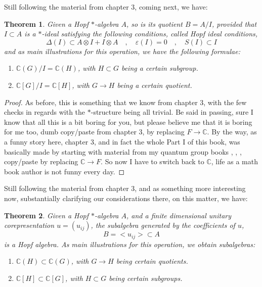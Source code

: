 \documentclass[12pt]{amsbook}
\newtheorem{theorem}{Theorem}[chapter]
\begin{document}
Still following the material from chapter 3, coming next, we have:

\begin{theorem}
Given a Hopf $*$-algebra $A$, so is its quotient $B=A/I$, provided that $I\subset A$ is a $*$-ideal satisfying the following conditions, called Hopf ideal conditions,
$$\Delta(I)\subset A\otimes I+I\otimes A\quad,\quad\varepsilon(I)=0\quad,\quad S(I)\subset I$$
and as main illustrations for this operation, we have the following formulae:
\begin{enumerate}
\item $\mathbb C(G)/I=\mathbb C(H)$, with $H\subset G$ being a certain subgroup.

\item $\mathbb C[G]/I=\mathbb C[H]$, with $G\to H$ being a certain quotient.
\end{enumerate}
\end{theorem}

\begin{proof}
As before, this is something that we know from chapter 3, with the few checks in regards with the $*$-structure being all trivial. Be said in passing, sure I know that all this is a bit boring for you, but please believe me that it is boring for me too, dumb copy/paste from chapter 3, by replacing $F\to\mathbb C$. By the way, as a funny story here, chapter 3, and in fact the whole Part I of this book, was basically made by starting with material from my quantum group books \cite{ba1}, \cite{ba2}, \cite{ba3}, copy/paste by replacing $\mathbb C\to F$. So now I have to switch back to $\mathbb C$, life as a math book author is not funny every day.
\end{proof}

Still following the material from chapter 3, and as something more interesting now, substantially clarifying our considerations there, on this matter, we have:

\begin{theorem}
Given a Hopf $*$-algebra $A$, and a finite dimensional unitary corepresentation $u=(u_{ij})$, the subalgebra generated by the coefficients of $u$,
$$B=<u_{ij}>\subset A$$
is a Hopf algebra. As main illustrations for this operation, we obtain subalgebras:
\begin{enumerate}
\item $\mathbb C(H)\subset\mathbb C(G)$, with $G\to H$ being certain quotients.

\item $\mathbb C[H]\subset \mathbb C[G]$, with $H\subset G$ being certain subgroups.
\end{enumerate}
\end{theorem}
\end{document}
